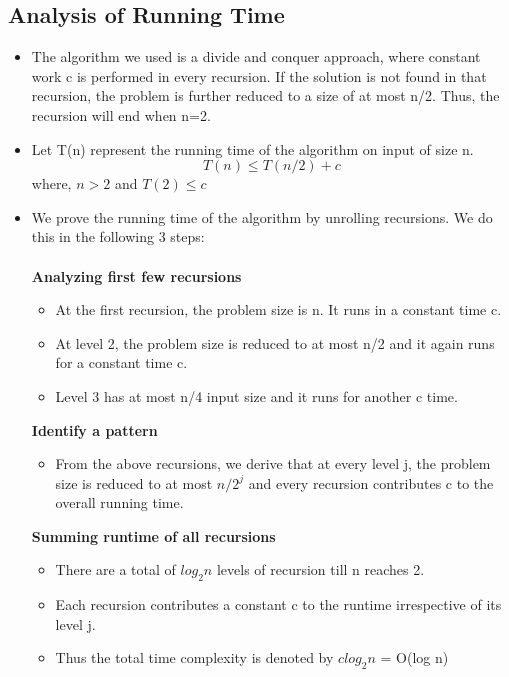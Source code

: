 \documentclass[12pt]{article}
\begin{document}
\subsection{Analysis of Running Time}
\begin{itemize}
    \item The algorithm we used is a divide and conquer approach, where constant work c is performed in every recursion. If the solution is not found in that recursion, the problem is further reduced to a size of at most n/2. Thus, the recursion will end when n=2.
    \item Let T(n) represent the running time of the algorithm on input of size n.
    \begin{equation}
        T(n) \leq T(n/2) + c
    \end{equation}
    where, $n>2$ and $T(2) \leq c$
    \item We prove the running time of the algorithm by unrolling recursions. We do this in the following 3 steps:\\\\
        \textbf{Analyzing first few recursions }
        \begin{itemize}
        \item At the first recursion, the problem size is n. It runs in a constant time c.
        \item At level 2, the problem size is reduced to at most n/2 and it again runs for a constant time c.
        \item Level 3 has at most n/4 input size and it runs for another c time.
        \end{itemize}
        \textbf{Identify a pattern }
        \begin{itemize}
            \item From the above recursions, we derive that at every level j, the problem size is reduced to at most $n/2^{j}$ and every recursion contributes c to the overall running time.
        \end{itemize}
        \textbf{Summing runtime of all recursions}
        \begin{itemize}
            \item There are a total of $log_2n$ levels of recursion  till n reaches 2.
            \item Each recursion contributes a constant c to the runtime irrespective of its level j.
            \item Thus the total time complexity is denoted by $clog_2n$ = O(log n)
        \end{itemize}

\end{itemize}
\end{document}
